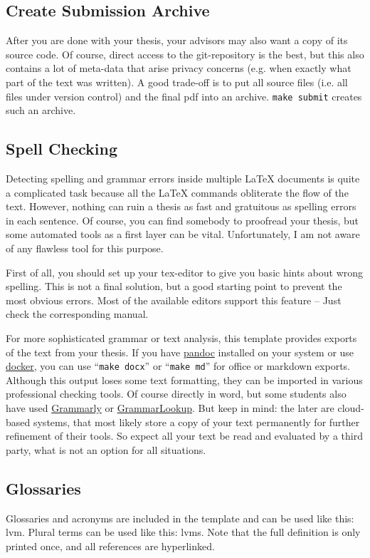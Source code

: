 \documentclass[../main.tex]{subfiles}
\begin{document}
\subsection{Create Submission Archive}
After you are done with your thesis, your advisors may also want a copy of its source code.
Of course, direct access to the git-repository is the best, but this also contains a lot of meta-data that arise privacy concerns (e.g. when exactly what part of the text was written).
A good trade-off is to put all source files (i.e. all files under version control) and the final pdf into an archive.
\texttt{make submit} creates such an archive.

\subsection{Spell Checking}
Detecting spelling and grammar errors inside multiple LaTeX documents is quite a complicated task because all the LaTeX commands obliterate the flow of the text.
However, nothing can ruin a thesis as fast and gratuitous as spelling errors in each sentence.
Of course, you can find somebody to proofread your thesis, but some automated tools as a first layer can be vital.
Unfortunately, I am not aware of any flawless tool for this purpose.

First of all, you should set up your tex-editor to give you basic hints about wrong spelling.
This is not a final solution, but a good starting point to prevent the most obvious errors.
Most of the available editors support this feature -- Just check the corresponding manual.

For more sophisticated grammar or text analysis, this template provides exports of the text from your thesis.
If you have \href{https://pandoc.org/}{pandoc} installed on your system or use \href{https://www.docker.com/}{docker}, you can use \enquote{\texttt{make docx}} or \enquote{\texttt{make md}} for office or markdown exports.
Although this output loses some text formatting, they can be imported in various professional checking tools.
Of course directly in word, but some students also have used \href{https://grammarly.com/}{Grammarly} or \href{https://www.grammarlookup.com/}{GrammarLookup}.
But keep in mind: the later are cloud-based systems, that most likely store a copy of your text permanently for further refinement of their tools.
So expect all your text be read and evaluated by a third party, what is not an option for all situations.

\subsection{Glossaries}
Glossaries and acronyms are included in the template and can be used like this: \gls{lvm}. Plural terms can be used like this: \glspl{lvm}. Note that the full definition is only printed once, and all references are hyperlinked. 
\end{document}

